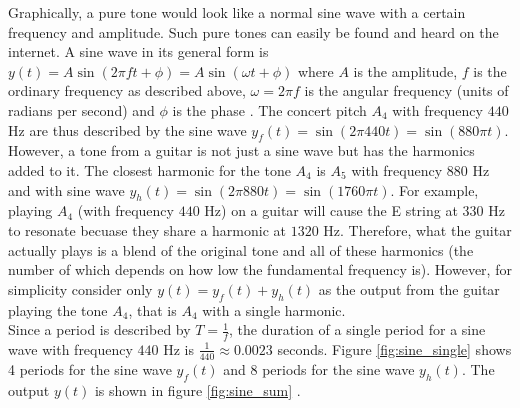 Graphically, a pure tone would look like a normal sine wave with a certain frequency and amplitude. Such pure tones can easily be found and heard on the internet. A sine wave in its general form is $y(t) = A\sin(2\pi f t + \phi) = A\sin(\omega t + \phi)$ where $A$ is the amplitude, $f$ is the ordinary frequency as described above, $\omega = 2 \pi f$ is the angular frequency (units of radians per second) and $\phi$ is the phase \cite{SineWave}. The concert pitch $A_4$ with frequency $440$ Hz are thus described by the sine wave $y_f(t) = \sin(2 \pi 440 t) = \sin(880 \pi t)$. \\
However, a tone from a guitar is not just a sine wave but has the harmonics added to it. The closest harmonic for the tone $A_4$ is $A_5$ with frequency $880$ Hz and with sine wave $y_h(t) = \sin(2 \pi 880 t) = \sin(1760 \pi t)$. For example, playing $A_4$ (with frequency $440$ Hz) on a guitar will cause the E string at $330$ Hz to resonate becuase they share a harmonic at $1320$ Hz. Therefore, what the guitar actually plays is a blend of the original tone and all of these harmonics (the number of which depends on how low the fundamental frequency is). However, for simplicity consider only $y(t) = y_f(t) + y_h(t)$ as the output from the guitar playing the tone $A_4$, that is $A_4$ with a single harmonic.
\\
Since a period is described by $T = \frac{1}{f}$, the duration of a single period for a sine wave with frequency $440$ Hz is $\frac{1}{440} \approx 0.0023$ seconds. Figure \ref{fig:sine_single} shows 4 periods for the sine wave $y_f(t)$ and 8 periods for the sine wave $y_h(t)$. The output $y(t)$ is shown in figure \ref{fig:sine_sum} \cite{harmonics}.


